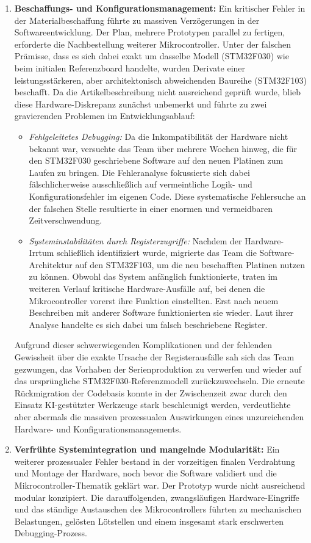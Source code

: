 \begin{enumerate}
	\item \textbf{Beschaffungs- und Konfigurationsmanagement:} 
	Ein kritischer Fehler in der Materialbeschaffung führte zu massiven Verzögerungen in der Softwareentwicklung. Der Plan, mehrere Prototypen parallel zu fertigen, erforderte die Nachbestellung weiterer Mikrocontroller. Unter der falschen Prämisse, dass es sich dabei exakt um dasselbe Modell (STM32F030) wie beim initialen Referenzboard handelte, wurden Derivate einer leistungsstärkeren, aber architektonisch abweichenden Baureihe (STM32F103) beschafft. Da die Artikelbeschreibung nicht ausreichend geprüft wurde, blieb diese Hardware-Diskrepanz zunächst unbemerkt und führte zu zwei gravierenden Problemen im Entwicklungsablauf:
	\begin{itemize}
		\item \textit{Fehlgeleitetes Debugging:} Da die Inkompatibilität der Hardware nicht bekannt war, versuchte das Team über mehrere Wochen hinweg, die für den STM32F030 geschriebene Software auf den neuen Platinen zum Laufen zu bringen. Die Fehleranalyse fokussierte sich dabei fälschlicherweise ausschließlich auf vermeintliche Logik- und Konfigurationsfehler im eigenen Code. Diese systematische Fehlersuche an der falschen Stelle resultierte in einer enormen und vermeidbaren Zeitverschwendung.
		\item \textit{Systeminstabilitäten durch Registerzugriffe:} Nachdem der Hardware-Irrtum schließlich identifiziert wurde, migrierte das Team die Software-Architektur auf den STM32F103, um die neu beschafften Platinen nutzen zu können. Obwohl das System anfänglich funktionierte, traten im weiteren Verlauf kritische Hardware-Ausfälle auf, bei denen die Mikrocontroller vorerst ihre Funktion einstellten. Erst nach neuem Beschreiben mit anderer Software funktionierten sie wieder. Laut ihrer Analyse handelte es sich dabei um falsch beschriebene Register.
	\end{itemize}
	Aufgrund dieser schwerwiegenden Komplikationen und der fehlenden Gewissheit über die exakte Ursache der Registerausfälle sah sich das Team gezwungen, das Vorhaben der Serienproduktion zu verwerfen und wieder auf das ursprüngliche STM32F030-Referenzmodell zurückzuwechseln. Die erneute Rückmigration der Codebasis konnte in der Zwischenzeit zwar durch den Einsatz KI-gestützter Werkzeuge stark beschleunigt werden, verdeutlichte aber abermals die massiven prozessualen Auswirkungen eines unzureichenden Hardware- und Konfigurationsmanagements.
	
	\item \textbf{Verfrühte Systemintegration und mangelnde Modularität:} 
	Ein weiterer prozessualer Fehler bestand in der vorzeitigen finalen Verdrahtung und Montage der Hardware, noch bevor die Software validiert und die Mikrocontroller-Thematik geklärt war. Der Prototyp wurde nicht ausreichend modular konzipiert. Die darauffolgenden, zwangsläufigen Hardware-Eingriffe und das ständige Austauschen des Mikrocontrollers führten zu mechanischen Belastungen, gelösten Lötstellen und einem insgesamt stark erschwerten Debugging-Prozess.
\end{enumerate}

